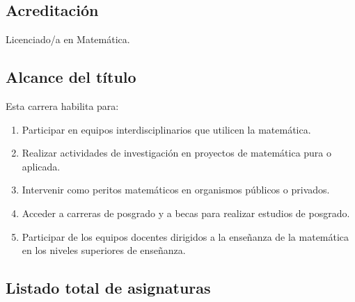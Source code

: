 \documentclass[a4paper, 12pt]{article}
\begin{document}
\subsection{Acreditación} Licenciado/a en Matemática.

\subsection{Alcance del título} Esta carrera habilita para:
    \begin{enumerate}

        \item Participar en equipos interdisciplinarios que utilicen la matemática.
        
        \item  Realizar actividades de investigación en proyectos de matemática         pura o aplicada.
       
       \item Intervenir como peritos matemáticos en organismos públicos o privados. 
       
        \item Acceder a carreras de posgrado y a becas para realizar estudios de posgrado.
       
       \item Participar de los equipos docentes dirigidos a la
         enseñanza de la matemática en los niveles superiores de enseñanza.
    
       
         
    \end{enumerate}


\newpage
\subsection{Listado total de asignaturas}
\fontsize{9pt}{9pt}\selectfont  
\end{document}
